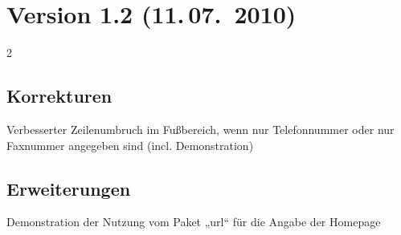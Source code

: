 \documentclass[a0paper,noDIN,MathematikA0]{tudmathposter}
\begin{document}
\section{Version 1.2 (11.\,07.~2010)}
\begin{multicols}2
\subsection{Korrekturen}
Verbesserter Zeilenumbruch im Fußbereich, wenn nur Telefonnummer oder nur Faxnummer angegeben sind (incl. Demonstration)
\subsection{Erweiterungen}
Demonstration der Nutzung vom Paket „url“ für die Angabe der Homepage
\end{multicols}
\end{document}
